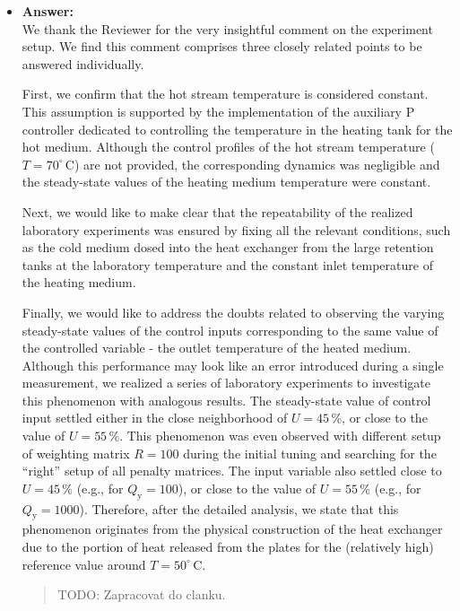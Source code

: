 \documentclass[a4paper,10pt]{article}
\newcommand{\answer}[1]{
	\begin{itemize}
		\item[] \textbf{Answer:}\\ #1
	\end{itemize}
}
\begin{document}
	\answer{
		We thank the Reviewer for the very insightful comment on the experiment setup. We find this comment comprises three closely related points to be answered individually.
		
		First, we confirm that the hot stream temperature is considered constant. This assumption is supported by the implementation of the auxiliary P controller dedicated to controlling the temperature in the heating tank for the hot medium. Although the control profiles of the hot stream temperature ($T = 70^{\circ}$\,C) are not provided, the corresponding dynamics was negligible and the steady-state values of the heating medium temperature were constant.
		
		Next, we would like to make clear that the repeatability of the realized laboratory experiments was ensured by fixing all the relevant conditions, such as the cold medium dosed into the heat exchanger from the large retention tanks at the laboratory temperature and the constant inlet temperature of the heating medium.
		
		Finally, we would like to address the doubts related to observing the varying steady-state values of the control inputs corresponding to the same value of the controlled variable - the outlet temperature of the heated medium. Although this performance may look like an error introduced during a single measurement, we realized a series of laboratory experiments to investigate this phenomenon with analogous results. The steady-state value of control input settled either in the close neighborhood of $U = 45\,\%$, or close to the value of $U = 55\,\%$. This phenomenon was even observed with different setup of weighting matrix $R = 100$ during the initial tuning and searching for the ``right'' setup of all penalty matrices. The input variable also settled close to $U = 45\,\%$ (e.g., for $Q_{\mathrm{y}} = 100$), or close to the value of $U = 55\,\%$ (e.g., for $Q_{\mathrm{y}} = 1000$). Therefore, after the detailed analysis, we state that this phenomenon originates from the physical construction of the heat exchanger due to the portion of heat released from the plates for the (relatively high) reference value around $T = 50^{\circ}$\,C.
		
		\begin{quote}
			TODO: Zapracovat do clanku. 			
		\end{quote}
	}
	
	
	
	
	
\end{document}
